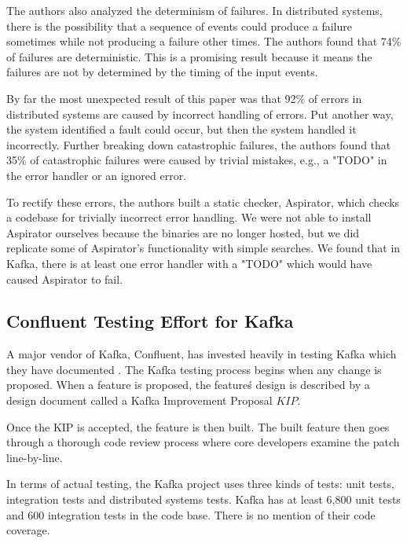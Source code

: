 \begin{multicols}{2}
The authors also analyzed the determinism of failures.
In distributed systems, there is the possibility that a sequence of events could produce a failure sometimes while not producing a failure other times.
The authors found that 74\% of failures are deterministic.
This is a promising result because it means the failures are not by determined by the timing of the input events.

By far the most unexpected result of this paper was that 92\% of errors in distributed systems are caused by incorrect handling of errors.
Put another way, the system identified a fault could occur, but then the system handled it incorrectly.
Further breaking down catastrophic failures, the authors found that 35\% of catastrophic failures were caused by trivial mistakes, e.g., a "TODO" in the error handler or an ignored error.

To rectify these errors, the authors built a static checker, Aspirator, which checks a codebase for trivially incorrect error handling.
We were not able to install Aspirator ourselves because the binaries are no longer hosted, but we did replicate some of Aspirator's functionality with simple searches.
We found that in Kafka, there is at least one error handler with a "TODO" which would have caused Aspirator to fail.

\subsection{Confluent Testing Effort for Kafka}

A major vendor of Kafka, Confluent, has invested heavily in testing Kafka which they have documented \cite{confluenttesting}.
The Kafka testing process begins when any change is proposed.
When a feature is proposed, the feature\'s design is described by a design document called a Kafka Improvement Proposal \(KIP\).

\vspace{1em}
\vspace{1em}
Once the KIP is accepted, the feature is then built.
The built feature then goes through a thorough code review process where core developers examine the patch line-by-line.

In terms of actual testing, the Kafka project uses three kinds of tests: unit tests, integration tests and distributed systems tests.
Kafka has at least 6,800 unit tests and 600 integration tests in the code base.
There is no mention of their code coverage.


\end{multicols}
